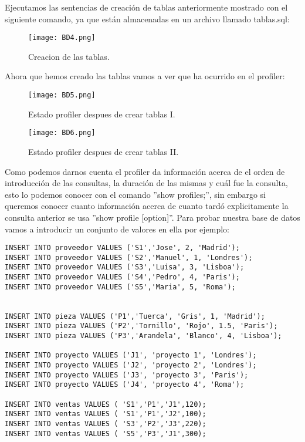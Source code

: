 \documentclass[a4paper, 11pt]{article} %
\begin{document}
Ejecutamos las sentencias de creación de tablas anteriormente mostrado con el siguiente comando, ya que están almacenadas en un archivo llamado tablas.sql:
\begin{figure}[H]
\centering 
\texttt{[image: BD4.png]} 
\caption{Creacion de las tablas.} 
\label{contexto:figura} 
\end{figure}

\pagebreak

Ahora que hemos creado las tablas vamos a ver que ha ocurrido en el profiler:
\begin{figure}[H]
\centering 
\texttt{[image: BD5.png]} 
\caption{Estado profiler despues de crear tablas I.} 
\label{contexto:figura} 
\end{figure}

\begin{figure}[H]
\centering 
\texttt{[image: BD6.png]} 
\caption{Estado profiler despues de crear tablas II.} 
\label{contexto:figura} 
\end{figure}

Como podemos darnos cuenta el profiler da información acerca de el orden de introducción de las consultas, la duración de las mismas y cuál fue la consulta, esto lo podemos conocer con el comando ''show profiles;'', sin embargo si queremos conocer cuanto información acerca de cuanto tardó explicitamente la consulta anterior se usa ''show profile [option]''. Para probar nuestra base de datos vamos a introducir un conjunto de valores en ella por ejemplo:

\begin{verbatim}
INSERT INTO proveedor VALUES ('S1','Jose', 2, 'Madrid');
INSERT INTO proveedor VALUES ('S2','Manuel', 1, 'Londres');
INSERT INTO proveedor VALUES ('S3','Luisa', 3, 'Lisboa');
INSERT INTO proveedor VALUES ('S4','Pedro', 4, 'Paris');
INSERT INTO proveedor VALUES ('S5','Maria', 5, 'Roma');


INSERT INTO pieza VALUES ('P1','Tuerca', 'Gris', 1, 'Madrid');
INSERT INTO pieza VALUES ('P2','Tornillo', 'Rojo', 1.5, 'Paris');
INSERT INTO pieza VALUES ('P3','Arandela', 'Blanco', 4, 'Lisboa');

INSERT INTO proyecto VALUES ('J1', 'proyecto 1', 'Londres');
INSERT INTO proyecto VALUES ('J2', 'proyecto 2', 'Londres');
INSERT INTO proyecto VALUES ('J3', 'proyecto 3', 'Paris');
INSERT INTO proyecto VALUES ('J4', 'proyecto 4', 'Roma');

INSERT INTO ventas VALUES ( 'S1','P1','J1',120);
INSERT INTO ventas VALUES ( 'S1','P1','J2',100);
INSERT INTO ventas VALUES ( 'S3','P2','J3',220);
INSERT INTO ventas VALUES ( 'S5','P3','J1',300);
\end{verbatim}
\end{document}
